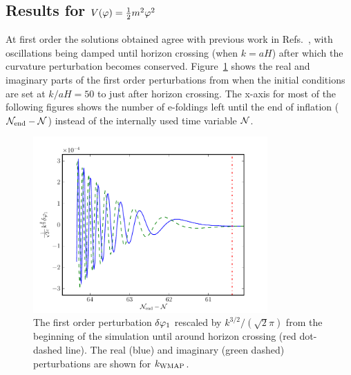 \subsection{Results for \texorpdfstring{$V(\varphi)=\frac{1}{2} m^2 \varphi^2$}{m-squared model}}
\label{sec:msqphisq-res}

At first order the solutions obtained agree with previous work in
Refs.~\cite{Salopek:1988qh, Martin:2006rs, Ringeval:2007am}, with oscillations
being damped until horizon crossing (when $k=aH$) after which the
curvature perturbation becomes conserved. Figure~\ref{fig:dp1} shows
the real and imaginary parts of the first order perturbations from
when the initial conditions are set at $k/aH=50$ to just after horizon
crossing. The x-axis for most of the following figures shows the
number of e-foldings left until the end of inflation ($\mathcal{N}_\mathrm{end}-\mathcal{N}$) instead
of the internally used time variable $\mathcal{N}$.
%
% 
\begin{figure}
 \centering
 \includegraphics[width=0.8\textwidth]{numerical/graphs/dp1_kwmap}
 \caption[First Order Perturbation]{The first order perturbation $\delta\varphi_{1}$ rescaled by
$k^{3/2}/(\sqrt{2}\pi)$ from the beginning of the simulation until around
horizon crossing (red dot-dashed line). The real (blue) and imaginary (green
dashed) perturbations are shown for $k_\mathrm{WMAP}$.}
\label{fig:dp1}
\end{figure}
% 



